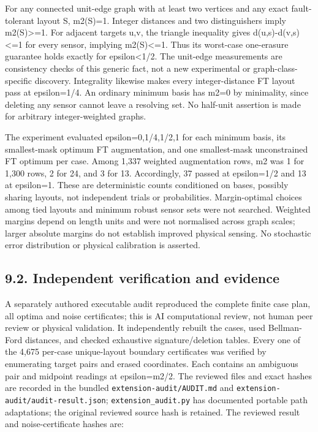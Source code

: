 \documentclass[
]{article}
\begin{document}
For any connected unit-edge graph with at least two vertices and any
exact fault-tolerant layout S, m2(S)=1. Integer distances and two
distinguishers imply m2(S)\textgreater=1. For adjacent targets u,v, the
triangle inequality gives \textbar d(u,s)-d(v,s)\textbar\textless=1 for
every sensor, implying m2(S)\textless=1. Thus its worst-case one-erasure
guarantee holds exactly for epsilon\textless1/2. The unit-edge
measurements are consistency checks of this generic fact, not a new
experimental or graph-class-specific discovery. Integrality likewise
makes every integer-distance FT layout pass at epsilon=1/4. An ordinary
minimum basis has m2=0 by minimality, since deleting any sensor cannot
leave a resolving set. No half-unit assertion is made for arbitrary
integer-weighted graphs.

The experiment evaluated epsilon=0,1/4,1/2,1 for each minimum basis, its
smallest-mask optimum FT augmentation, and one smallest-mask
unconstrained FT optimum per case. Among 1,337 weighted augmentation
rows, m2 was 1 for 1,300 rows, 2 for 24, and 3 for 13. Accordingly, 37
passed at epsilon=1/2 and 13 at epsilon=1. These are deterministic
counts conditioned on bases, possibly sharing layouts, not independent
trials or probabilities. Margin-optimal choices among tied layouts and
minimum robust sensor sets were not searched. Weighted margins depend on
length units and were not normalised across graph scales; larger
absolute margins do not establish improved physical sensing. No
stochastic error distribution or physical calibration is asserted.

\subsection{9.2. Independent verification and
evidence}\label{independent-verification-and-evidence}

A separately authored executable audit reproduced the complete finite
case plan, all optima and noise certificates; this is AI computational
review, not human peer review or physical validation. It independently
rebuilt the cases, used Bellman-Ford distances, and checked exhaustive
signature/deletion tables. Every one of the 4,675 per-case unique-layout
boundary certificates was verified by enumerating target pairs and
erased coordinates. Each contains an ambiguous pair and midpoint
readings at epsilon=m2/2. The reviewed files and exact hashes are
recorded in the bundled \texttt{extension-audit/AUDIT.md} and
\texttt{extension-audit/audit-result.json}; \texttt{extension\_audit.py}
has documented portable path adaptations; the original reviewed source
hash is retained. The reviewed result and noise-certificate hashes are:
\end{document}
